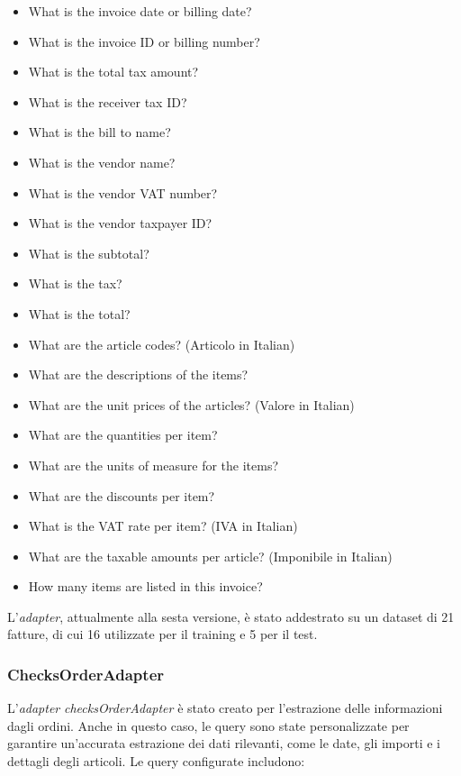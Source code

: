 \begin{itemize}
    \item What is the invoice date or billing date?
    \item What is the invoice ID or billing number?
    \item What is the total tax amount?
    \item What is the receiver tax ID?
    \item What is the bill to name?
    \item What is the vendor name?
    \item What is the vendor VAT number?
    \item What is the vendor taxpayer ID?
    \item What is the subtotal?
    \item What is the tax?
    \item What is the total?
    \item What are the article codes? (Articolo in Italian)
    \item What are the descriptions of the items?
    \item What are the unit prices of the articles? (Valore in Italian)
    \item What are the quantities per item?
    \item What are the units of measure for the items?
    \item What are the discounts per item?
    \item What is the VAT rate per item? (IVA in Italian)
    \item What are the taxable amounts per article? (Imponibile in Italian)
    \item How many items are listed in this invoice?
\end{itemize}

L'\textit{adapter}, attualmente alla sesta versione, è stato addestrato su un dataset di 21 fatture, di cui 16 utilizzate per il training e 5 per il test.

\subsubsection{ChecksOrderAdapter}
L'\textit{adapter} \textit{checksOrderAdapter} è stato creato per l'estrazione delle informazioni dagli ordini. Anche in questo caso, le query sono state personalizzate per garantire un'accurata estrazione dei dati rilevanti, come le date, gli importi e i dettagli degli articoli. Le query configurate includono:


